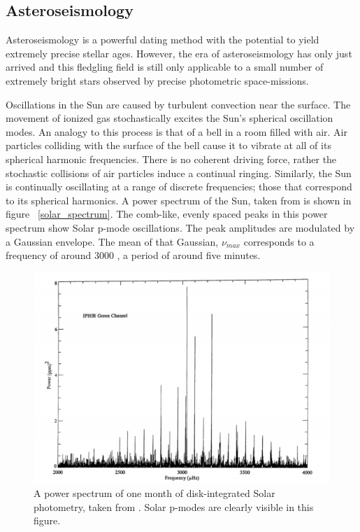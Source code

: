 
\subsection{Asteroseismology}

Asteroseismology is a powerful dating method with the potential to yield
extremely precise stellar ages.
However, the era of asteroseismology has only just arrived and this fledgling
field is still only applicable to a small number of extremely bright stars
observed by precise photometric space-missions.

Oscillations in the Sun are caused by turbulent convection near the surface.
The movement of ionized gas stochastically excites the Sun's spherical
oscillation modes.
An analogy to this process is that of a bell in a room filled with air.
Air particles colliding with the surface of the bell cause it to vibrate at
all of its spherical harmonic frequencies.
There is no coherent driving force, rather the stochastic collisions of air
particles induce a continual ringing.
Similarly, the Sun is continually oscillating at a range of discrete
frequencies; those that correspond to its spherical harmonics.
A power spectrum of the Sun, taken from \citet{brown} is shown in figure
~\ref{solar_spectrum}.
The comb-like, evenly spaced peaks in this power spectrum show Solar p-mode
oscillations.
The peak amplitudes are modulated by a Gaussian envelope.
The mean of that Gaussian, $\nu_{max}$ corresponds to a frequency of around
3000 \uHz, a period of around five minutes.

\begin{figure}[p]
\begin{center}
\includegraphics[width=6in, clip=true]{figures/solar_spectrum.pdf}
\caption{A power spectrum of one month of disk-integrated Solar photometry,
taken from \citet{toutain}. Solar p-modes are clearly visible in this figure.}
\label{fig:solar_spectrum}
\end{center}
\end{figure}

